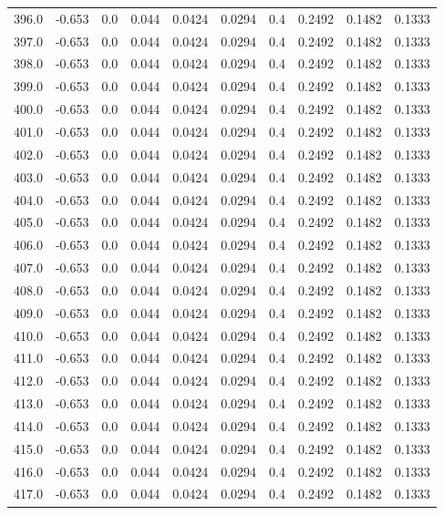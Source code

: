 \begin{longtable}{lrrrrrrrrr}
396.0 & -0.653 & 0.0 & 0.044 & 0.0424 & 0.0294 & 0.4 & 0.2492 & 0.1482 & 0.1333 \\
397.0 & -0.653 & 0.0 & 0.044 & 0.0424 & 0.0294 & 0.4 & 0.2492 & 0.1482 & 0.1333 \\
398.0 & -0.653 & 0.0 & 0.044 & 0.0424 & 0.0294 & 0.4 & 0.2492 & 0.1482 & 0.1333 \\
399.0 & -0.653 & 0.0 & 0.044 & 0.0424 & 0.0294 & 0.4 & 0.2492 & 0.1482 & 0.1333 \\
400.0 & -0.653 & 0.0 & 0.044 & 0.0424 & 0.0294 & 0.4 & 0.2492 & 0.1482 & 0.1333 \\
401.0 & -0.653 & 0.0 & 0.044 & 0.0424 & 0.0294 & 0.4 & 0.2492 & 0.1482 & 0.1333 \\
402.0 & -0.653 & 0.0 & 0.044 & 0.0424 & 0.0294 & 0.4 & 0.2492 & 0.1482 & 0.1333 \\
403.0 & -0.653 & 0.0 & 0.044 & 0.0424 & 0.0294 & 0.4 & 0.2492 & 0.1482 & 0.1333 \\
404.0 & -0.653 & 0.0 & 0.044 & 0.0424 & 0.0294 & 0.4 & 0.2492 & 0.1482 & 0.1333 \\
405.0 & -0.653 & 0.0 & 0.044 & 0.0424 & 0.0294 & 0.4 & 0.2492 & 0.1482 & 0.1333 \\
406.0 & -0.653 & 0.0 & 0.044 & 0.0424 & 0.0294 & 0.4 & 0.2492 & 0.1482 & 0.1333 \\
407.0 & -0.653 & 0.0 & 0.044 & 0.0424 & 0.0294 & 0.4 & 0.2492 & 0.1482 & 0.1333 \\
408.0 & -0.653 & 0.0 & 0.044 & 0.0424 & 0.0294 & 0.4 & 0.2492 & 0.1482 & 0.1333 \\
409.0 & -0.653 & 0.0 & 0.044 & 0.0424 & 0.0294 & 0.4 & 0.2492 & 0.1482 & 0.1333 \\
410.0 & -0.653 & 0.0 & 0.044 & 0.0424 & 0.0294 & 0.4 & 0.2492 & 0.1482 & 0.1333 \\
411.0 & -0.653 & 0.0 & 0.044 & 0.0424 & 0.0294 & 0.4 & 0.2492 & 0.1482 & 0.1333 \\
412.0 & -0.653 & 0.0 & 0.044 & 0.0424 & 0.0294 & 0.4 & 0.2492 & 0.1482 & 0.1333 \\
413.0 & -0.653 & 0.0 & 0.044 & 0.0424 & 0.0294 & 0.4 & 0.2492 & 0.1482 & 0.1333 \\
414.0 & -0.653 & 0.0 & 0.044 & 0.0424 & 0.0294 & 0.4 & 0.2492 & 0.1482 & 0.1333 \\
415.0 & -0.653 & 0.0 & 0.044 & 0.0424 & 0.0294 & 0.4 & 0.2492 & 0.1482 & 0.1333 \\
416.0 & -0.653 & 0.0 & 0.044 & 0.0424 & 0.0294 & 0.4 & 0.2492 & 0.1482 & 0.1333 \\
417.0 & -0.653 & 0.0 & 0.044 & 0.0424 & 0.0294 & 0.4 & 0.2492 & 0.1482 & 0.1333 \\

\end{longtable}
